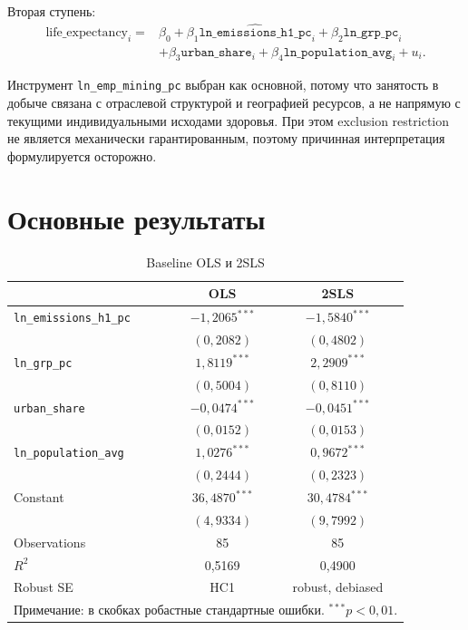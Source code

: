 \documentclass[11pt,a4paper]{article}
\begin{document}
Вторая ступень:
\begin{equation}
\label{eq:second}
\begin{aligned}
\text{life\_expectancy}_i ={}& \beta_0+\beta_1\widehat{\texttt{ln\_emissions\_h1\_pc}}_i+\beta_2\texttt{ln\_grp\_pc}_i\\
&+\beta_3\texttt{urban\_share}_i+\beta_4\texttt{ln\_population\_avg}_i+u_i .
\end{aligned}
\end{equation}

Инструмент \texttt{ln\_emp\_mining\_pc} выбран как основной, потому что занятость в добыче связана с отраслевой структурой и географией ресурсов, а не напрямую с текущими индивидуальными исходами здоровья. При этом exclusion restriction не является механически гарантированным, поэтому причинная интерпретация формулируется осторожно.

\section{Основные результаты}

\begin{table}[H]
\centering
\caption{Baseline OLS и 2SLS}
\label{tab:main}
\begin{tabular}{lcc}
\toprule
 & \textbf{OLS} & \textbf{2SLS} \\
\midrule
\texttt{ln\_emissions\_h1\_pc} & $-1{,}2065^{***}$ & $-1{,}5840^{***}$ \\
 & $(0{,}2082)$ & $(0{,}4802)$ \\
\texttt{ln\_grp\_pc} & $1{,}8119^{***}$ & $2{,}2909^{***}$ \\
 & $(0{,}5004)$ & $(0{,}8110)$ \\
\texttt{urban\_share} & $-0{,}0474^{***}$ & $-0{,}0451^{***}$ \\
 & $(0{,}0152)$ & $(0{,}0153)$ \\
\texttt{ln\_population\_avg} & $1{,}0276^{***}$ & $0{,}9672^{***}$ \\
 & $(0{,}2444)$ & $(0{,}2323)$ \\
Constant & $36{,}4870^{***}$ & $30{,}4784^{***}$ \\
 & $(4{,}9334)$ & $(9{,}7992)$ \\
\midrule
Observations & 85 & 85 \\
$R^2$ & 0{,}5169 & 0{,}4900 \\
Robust SE & HC1 & robust, debiased \\
\bottomrule
\multicolumn{3}{l}{\footnotesize Примечание: в скобках робастные стандартные ошибки. $^{***}p<0{,}01$.}
\end{tabular}
\end{table}
\end{document}
